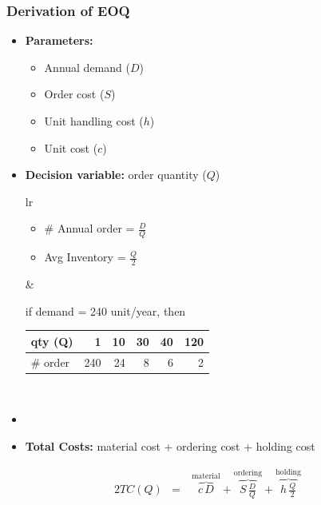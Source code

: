 \documentclass[10pt,handout,notes=show]{beamer}
\begin{document}
\begin{frame}
  \frametitle{Derivation of EOQ }

  \begin{itemize}
    \item \textbf{Parameters:}
    \begin{itemize}
      \item Annual demand ($D$)
      \item Order cost ($S$)
      \item Unit handling cost ($h$)
      \item Unit cost ($c$)
    \end{itemize}
    \item \textbf{Decision variable:} order quantity ($Q$) \hfill {}
    \begin{tabular}{lr}
      \begin{minipage}{0.4\textwidth}
        \begin{itemize}
        \item \# Annual order = $\frac{D}{Q}$
        \item Avg Inventory = $\frac{Q}{2}$
        \end{itemize}
      \end{minipage}
    &
      \begin{minipage}{0.55\textwidth} \footnotesize{
      if demand = 240 unit/year, then \\
      \begin{tabular}{||l|rrrrr||} \hline \hline
        qty (Q)    & 1   & 10  & 30 & 40 & 120 \\ \hline
        \# order    & 240 &  24 &  8 & 6  & 2  \\ \hline \hline
      \end{tabular} }
    \end{minipage}\\
    \end{tabular}
    \item[]
    \item \textbf{Total Costs:} material cost + ordering cost + holding cost
  \end{itemize}
  \begin{alignat*}{2}
    TC(Q)  &=\ & \overbrace{c\, D  }^{\mbox{material}}
            + \overbrace{S\,\frac{D}{Q}  }^{\mbox{ordering}}
            + \overbrace{h\,\frac{Q}{2}  }^{\mbox{holding}}
  \end{alignat*}


\end{frame}
\end{document}

